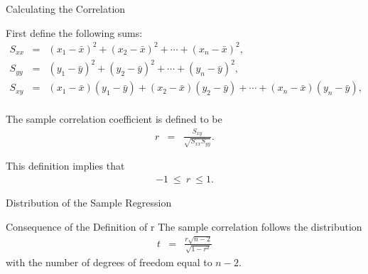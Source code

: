 \begin{frame}{Calculating the Correlation}

  First define the following sums:
  \begin{eqnarray*}
    S_{xx} & = & (x_1-\bar{x})^2 + (x_2-\bar{x})^2 + \cdots + (x_n-\bar{x})^2, \\
    S_{yy} & = & (y_1-\bar{y})^2 + (y_2-\bar{y})^2 + \cdots + (y_n-\bar{y})^2, \\
    S_{xy} & = & (x_1-\bar{x})(y_1-\bar{y}) + (x_2-\bar{x})(y_2-\bar{y}) + \cdots + (x_n-\bar{x})(y_n-\bar{y}), \\
  \end{eqnarray*}


  \begin{definition}
    The sample correlation coefficient is defined to be
    \begin{eqnarray*}
      r & = & \frac{S_{xy}}{\sqrt{S_{xx} S_{yy}}}.
    \end{eqnarray*}
  \end{definition}

  This definition implies that
  \begin{eqnarray*}
    -1 ~ \leq ~ r ~ \leq 1.
  \end{eqnarray*}
  
\end{frame}


\begin{frame}{Distribution of the Sample Regression}

  \begin{block}{Consequence of the Definition of r}
    The sample correlation follows the distribution
    \begin{eqnarray*}
      t & = & \frac{r\sqrt{n-2}}{\sqrt{1-r^2}}
    \end{eqnarray*}
    with the number of degrees of freedom equal to $n-2$.
  \end{block}
  
\end{frame}




